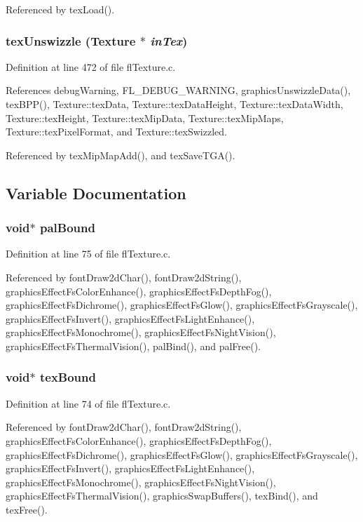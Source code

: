 Referenced by tex\-Load().
\subsubsection{ tex\-Unswizzle ({\bf Texture} $\ast$ {\em in\-Tex})}\label{flTexture_8h_9974158b286d32e981d2f00f301c00eb}




Definition at line 472 of file fl\-Texture.c.

References debug\-Warning, FL\_\-DEBUG\_\-WARNING, graphics\-Unswizzle\-Data(), tex\-BPP(), Texture::tex\-Data, Texture::tex\-Data\-Height, Texture::tex\-Data\-Width, Texture::tex\-Height, Texture::tex\-Mip\-Data, Texture::tex\-Mip\-Maps, Texture::tex\-Pixel\-Format, and Texture::tex\-Swizzled.

Referenced by tex\-Mip\-Map\-Add(), and tex\-Save\-TGA().

\subsection{Variable Documentation}
\subsubsection{\setlength{\rightskip}{0pt plus 5cm}void$\ast$ {\bf pal\-Bound}}\label{flTexture_8h_e67e55c1dd935fedcb7c2fe59b24e832}




Definition at line 75 of file fl\-Texture.c.

Referenced by font\-Draw2d\-Char(), font\-Draw2d\-String(), graphics\-Effect\-Fs\-Color\-Enhance(), graphics\-Effect\-Fs\-Depth\-Fog(), graphics\-Effect\-Fs\-Dichrome(), graphics\-Effect\-Fs\-Glow(), graphics\-Effect\-Fs\-Grayscale(), graphics\-Effect\-Fs\-Invert(), graphics\-Effect\-Fs\-Light\-Enhance(), graphics\-Effect\-Fs\-Monochrome(), graphics\-Effect\-Fs\-Night\-Vision(), graphics\-Effect\-Fs\-Thermal\-Vision(), pal\-Bind(), and pal\-Free().
\subsubsection{\setlength{\rightskip}{0pt plus 5cm}void$\ast$ {\bf tex\-Bound}}\label{flTexture_8h_669099ea7e18ce677cfd3a697f83b71c}




Definition at line 74 of file fl\-Texture.c.

Referenced by font\-Draw2d\-Char(), font\-Draw2d\-String(), graphics\-Effect\-Fs\-Color\-Enhance(), graphics\-Effect\-Fs\-Depth\-Fog(), graphics\-Effect\-Fs\-Dichrome(), graphics\-Effect\-Fs\-Glow(), graphics\-Effect\-Fs\-Grayscale(), graphics\-Effect\-Fs\-Invert(), graphics\-Effect\-Fs\-Light\-Enhance(), graphics\-Effect\-Fs\-Monochrome(), graphics\-Effect\-Fs\-Night\-Vision(), graphics\-Effect\-Fs\-Thermal\-Vision(), graphics\-Swap\-Buffers(), tex\-Bind(), and tex\-Free().